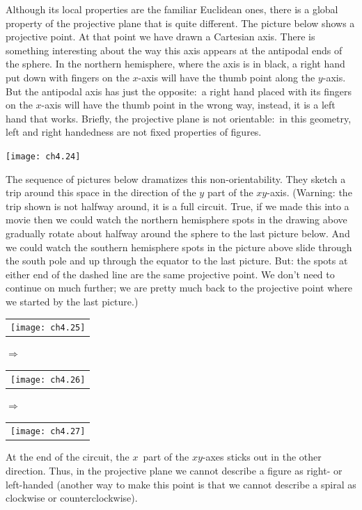 Although its local properties are the familiar Euclidean ones,
there is a global property of the projective plane that is
quite different.
The picture below shows a projective point.
At that point we have drawn a Cartesian axis.
There is something interesting about the way this axis appears at the 
antipodal ends of the sphere.
In the northern hemisphere, where the axis is in black, a
right hand put down with fingers on the $x$-axis 
will have the thumb point along the $y$-axis.
But the antipodal axis has just the opposite:~a 
right hand placed with its fingers on the $x$-axis will have 
the thumb point in the wrong way, instead, it is a left hand 
that works.
Briefly, the projective plane is not orientable:~in this geometry,
left and right handedness are not fixed properties of figures.
\begin{center}
  \texttt{[image: ch4.24]}
\end{center}
The sequence of pictures below dramatizes this non-orientability.
They sketch a trip around this space in the direction of the
$y$ part of the $xy$-axis.
(Warning: the trip shown is not halfway around, it is a full circuit.
True, if we made this into a movie then we could watch 
the northern hemisphere spots in 
the drawing above gradually rotate about halfway around the sphere to 
the last picture below.
And we could watch the southern hemisphere spots in the picture above slide 
through the south pole and up through the equator to
the last picture.
But: the spots at either end of the dashed line are the same 
projective point.
We don't need to continue on much further;
we are pretty much back to the projective point where we started
by the last picture.) 
\begin{center}
  \begin{tabular}{@{}c@{}}\texttt{[image: ch4.25]}\end{tabular}
\qquad\mbox{$\Longrightarrow$}\qquad
  \begin{tabular}{@{}c@{}}\texttt{[image: ch4.26]}\end{tabular}
\qquad\mbox{$\Longrightarrow$}\qquad
  \begin{tabular}{@{}c@{}}\texttt{[image: ch4.27]}\end{tabular}
\end{center}
At the end of the circuit, 
the $x$~part of the $xy$-axes sticks out in the other direction.
Thus, 
in the projective plane we cannot describe a figure as right-{} or left-handed
(another way to make this point 
is that we cannot describe a spiral as clockwise or
counterclockwise).

